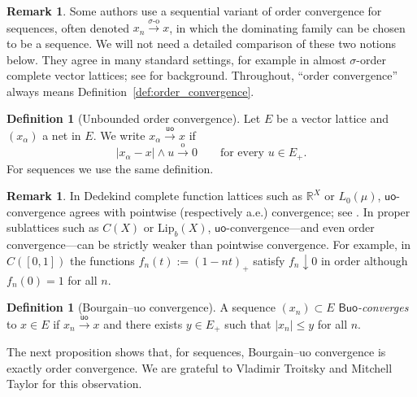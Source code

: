 \documentclass[11pt]{amsart}
\theoremstyle{definition}
\newtheorem{definition}[theorem]{Definition}
\newtheorem{remark}[theorem]{Remark}
\newcommand{\R}{\mathbb{R}}
\newcommand{\uo}{\ensuremath{\mathsf{uo}}}
\newcommand{\Buo}{\ensuremath{\mathsf{Buo}}}
\renewcommand{\le}{\leqslant}
\begin{document}
\begin{remark}\label{rem:sigma_order_convention}
Some authors use a sequential variant of order convergence for sequences, often
denoted $x_n\xrightarrow{\sigma\text{-}\mathrm{o}}x$, in which the dominating
family can be chosen to be a sequence.  We will not need a detailed comparison
of these two notions below.  They agree in many standard settings, for example
in almost $\sigma$-order complete vector lattices; see
\cite{AbramovichSirotkin2005,TaylorThesis2018} for background.  Throughout,
``order convergence'' always means Definition~\ref{def:order_convergence}.
\end{remark}

\begin{definition}[Unbounded order convergence]\label{def:uo_convergence}
Let $E$ be a vector lattice and $(x_\alpha)$ a net in $E$.  We write
$x_\alpha\xrightarrow{\uo}x$ if
\[
|x_\alpha-x|\wedge u\xrightarrow{\mathrm{o}}0
\qquad\text{for every }u\in E_+.
\]
For sequences we use the same definition.
\end{definition}

\begin{remark}\label{rem:uo_not_pointwise}
In Dedekind complete function lattices such as $\R^X$ or $L_0(\mu)$,
$\uo$-convergence agrees with pointwise (respectively a.e.) convergence; see
\cite[{\S}3]{GaoXanthos2014}.  In proper sublattices such as $C(X)$ or
$\mathrm{Lip}_b(X)$, $\uo$-convergence---and even order convergence---can be
strictly weaker than pointwise convergence.  For example, in $C([0,1])$ the
functions $f_n(t):=(1-nt)_+$ satisfy $f_n\downarrow 0$ in order although
$f_n(0)=1$ for all $n$.
\end{remark}

\begin{definition}[Bourgain--uo convergence]
A sequence $(x_n)\subset E$ \emph{\Buo-converges} to $x\in E$ if
$x_n\xrightarrow{\uo}x$ and there exists $y\in E_+$ such that
$|x_n|\le y$ for all $n$.
\end{definition}

The next proposition shows that, for sequences, Bourgain--uo convergence is
exactly order convergence.  We are grateful to Vladimir Troitsky and Mitchell
Taylor for this observation.
\end{document}
